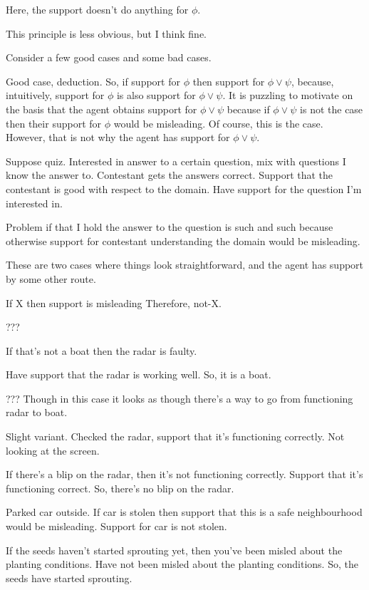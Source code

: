 Here, the support doesn't do anything for \(\phi\).

This principle is less obvious, but I think fine.

Consider a few good cases and some bad cases.

Good case, deduction.
So, if support for \(\phi\) then support for \(\phi \lor \psi\), because, intuitively, support for \(\phi\) is also support for \(\phi \lor \psi\).
It is puzzling to motivate on the basis that the agent obtains support for \(\phi \lor \psi\) because if \(\phi \lor \psi\) is not the case then their support for \(\phi\) would be misleading.
Of course, this is the case.
However, that is not why the agent has support for \(\phi \lor \psi\).


Suppose quiz.
Interested in answer to a certain question, mix with questions I know the answer to.
Contestant gets the answers correct.
Support that the contestant is good with respect to the domain.
Have support for the question I'm interested in.

Problem if that I hold the answer to the question is such and such because otherwise support for contestant understanding the domain would be misleading.

These are two cases where things look straightforward, and the agent has support by some other route.

If X then support is misleading
Therefore, not-X.

???

If that's not a boat then the radar is faulty.

Have support that the radar is working well.
So, it is a boat.

??? Though in this case it looks as though there's a way to go from functioning radar to boat.

Slight variant.
Checked the radar, support that it's functioning correctly.
Not looking at the screen.

If there's a blip on the radar, then it's not functioning correctly.
Support that it's functioning correct.
So, there's no blip on the radar.



Parked car outside.
If car is stolen then support that this is a safe neighbourhood would be misleading.
Support for car is not stolen.


If the seeds haven't started sprouting yet, then you've been misled about the planting conditions.
Have not been misled about the planting conditions.
So, the seeds have started sprouting.

